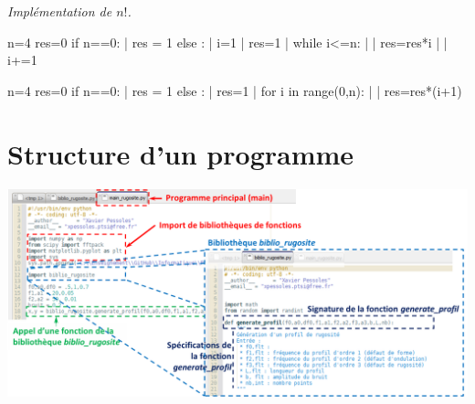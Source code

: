 \documentclass[10pt]{article}
\begin{document}
\begin{exemple}
\textit{Implémentation de $n!$.}

\begin{py}
\begin{minipage}[t]{.48\linewidth}
\begin{python}
n=4
res=0
if n==0:
    | res = 1
else :
    | i=1    
    | res=1
    | while i<=n:
    |     | res=res*i
    |     | i+=1
\end{python}
\end{minipage} \hfill
\begin{minipage}[t]{.48\linewidth}
\begin{python}
n=4
res=0
if n==0:
    | res = 1
else :
    | res=1    
    | for i in range(0,n):
    |     | res=res*(i+1)
\end{python}
\end{minipage} 
\end{py}
\end{exemple}
\section{Structure d'un programme}
\begin{center}
\includegraphics[width=\textwidth]{images/fonctions}
\end{center}
\end{document}
